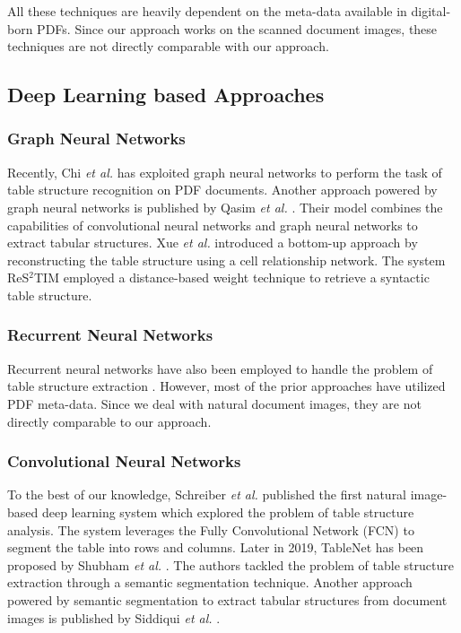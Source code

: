 \documentclass{ieeeaccess}
\begin{document}
All these techniques are heavily dependent on the meta-data available in digital-born PDFs. Since our approach works on the scanned document images, these techniques are not directly comparable with our approach.


\subsection{Deep Learning based Approaches}


\subsubsection{Graph Neural Networks}
Recently, Chi \textit{et al.} \cite{b23} has exploited graph neural networks \cite{b28} to perform the task of table structure recognition on PDF documents. Another approach powered by graph neural networks is published by Qasim \textit{et al.} \cite{b24}. Their model combines the capabilities of convolutional neural networks and graph neural networks to extract tabular structures. Xue \textit{et al.} introduced a bottom-up approach by reconstructing the table structure using a cell relationship network. The system ReS${^2}$TIM \cite{b25} employed a distance-based weight technique to retrieve a syntactic table structure.


\subsubsection{Recurrent Neural Networks}

Recurrent neural networks \cite{b29} have also been employed to handle the problem of table structure extraction \cite{b30,b31}. However, most of the prior approaches have utilized PDF meta-data. Since we deal with natural document images, they are not directly comparable to our approach. 


\subsubsection{Convolutional Neural Networks}

To the best of our knowledge, Schreiber \textit{et al.} \cite{b27} published the first natural image-based deep learning system which explored the problem of table structure analysis. The system leverages the Fully Convolutional Network (FCN) \cite{b62} to segment the table into rows and columns. Later in 2019, TableNet has been proposed by Shubham \textit{et al.} \cite{b28}. The authors tackled the problem of table structure extraction through a semantic segmentation technique. Another approach powered by semantic segmentation to extract tabular structures from document images is published by Siddiqui \textit{et al.} \cite{b32}. 
\end{document}
